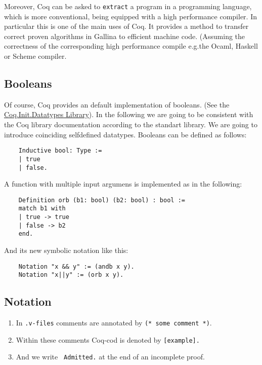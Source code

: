     Moreover, Coq can be asked to \lstinline!extract! a program in a programming language, which is more conventional, being equipped with a high performance compiler.
    In particular this is one of the main uses of Coq. 
    It provides a method to transfer correct proven algorithms in Gallina to efficient machine code.
    (Assuming the correctness of the corresponding high performance compile e.g.the Ocaml, Haskell or Scheme compiler. 
    
    \subsection{Booleans}
    Of course, Coq provides an default implementation of booleans. (See the \href{https://www.cs.princeton.edu/courses/archive/fall07/cos595/stdlib/html/Coq.Init.Datatypes.html}{Coq.Init.Datatypes Library}). %
    In the following we are going to be consistent with the Coq library documentation according to the standart library. We are going to introduce coinciding selfdefined datatypes.
    Booleans can be defined as follows:
    
    \label{Def:booleans}
    \begin{lstlisting}    
    Inductive bool: Type :=
    | true
    | false.
    \end{lstlisting}
    
    A function with multiple input argumens is implemented as in the following:
    \begin{lstlisting}
    Definition orb (b1: bool) (b2: bool) : bool :=
    match b1 with
    | true -> true
    | false -> b2
    end.
    \end{lstlisting}
     
    And its new symbolic notation like this:
    \begin{lstlisting}
    Notation "x && y" := (andb x y).
    Notation "x||y" := (orb x y).
    \end{lstlisting}
     
     \subsection{Notation}
    \begin{enumerate}
     \item In \texttt{.v-files} comments are annotated by \lstinline!(* some comment *)!. 
     \item Within these comments Coq-cod is denoted by \lstinline![example].! 
     \item And we write \lstinline! Admitted.! at the end of an incomplete proof.    
     \end{enumerate}
     
